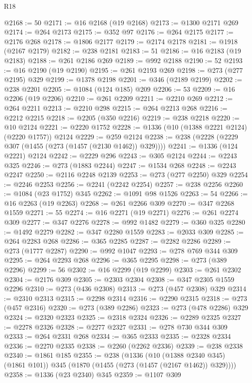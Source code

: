 \begin{lexlean}{R18}
\begin{coremodule}
{{{{{{{{{{{{{{{{{{{{{{{{{{{{{{{{{{{{{{{{{{{{{{{{{{{{{{{{{{{{{{{{{{{{{{{{{{{{{{{{{{{{{{{{{{{{{{{{{{{{{{{{{{{{{{{{{{{{{{{{{{{{{{{{{{{{{{{{{{{{{{{@2168 := 50
@2171 := @16 @2168 (@19 @2168)
@2173 := @1300 @2171 @269
@2174 := @264 @2173
@2175 := @352 @97
@2176 := @264 @2175
@2177 := @2176 @268
@2178 := @1806 @2177
@2179 := @2174 @2178
@2181 := @1918 (@2167 @2179)
@2182 := @238 @2181
@2183 := 51
@2186 := @16 @2183 (@19 @2183)
@2188 := @261 @2186 @269
@2189 := @992 @2188
@2190 := 52
@2193 := @16 @2190 (@19 @2190)
@2195 := @261 @2193 @269
@2198 := @273 (@277 @2195) @329
@2199 := @1378 @2198
@2201 := @346 (@2189 @2199)
@2202 := @238 @2201
@2205 := @1084 (@124 @185) @209
@2206 := 53
@2209 := @16 @2206 (@19 @2206)
@2210 := @261 @2209
@2211 := @2210 @269
@2212 := @264 @2211
@2213 := @2210 @298
@2215 := @264 @2213 @268
@2216 := @2212 @2215
@2218 := @2205 (@350 @2216)
@2219 := @238 @2218
@2220 := @10 @2124
@2221 := @2220 @1752
@2228 := @1336 (@10 (@1388 @2221 @2124) (@2220 @1757)) @2124
@2229 := @259 @2124
@2238 := @238 (@2228 (@2229 @307 (@1455 (@273 (@1457 (@2130 @1462)) @329))))
@2241 := @1336 (@124 @2221) @2124
@2242 := @2229 @296
@2243 := @305 @2124
@2244 := @2243 @325
@2246 := @273 (@1883 @2244)
@2247 := @1534 @268
@2248 := @2243 @2247
@2250 := @2116 @2248 @2139
@2253 := @273 (@277 @2250) @329
@2254 := @2246 @2253
@2256 := @2241 (@2242 @2254)
@2257 := @238 @2256
@2260 := @1084 (@23 @1752) @345
@2262 := @1091 @98 @1526
@2263 := 54
@2266 := @16 @2263 (@19 @2263)
@2268 := @261 @2266 @309
@2270 := @347 @2268 @1559
@2271 := 55
@2274 := @16 @2271 (@19 @2271)
@2276 := @261 @2274 @309
@2277 := @347 @2276
@2278 := @992 @1482
@2279 := @360 @325
@2280 := @1492 @2279
@2282 := @347 @2280 @1559
@2283 := @2033 @309
@2285 := @264 @2283 @268
@2286 := @365 @2285
@2287 := @2282 @2286
@2289 := @273 (@1777 @2287)
@2290 := @992 @1047
@2293 := @278 @769 @344 @309
@2295 := @264 @2293 @268
@2296 := @365 @2295
@2298 := @273 (@389 @2296)
@2299 := 56
@2302 := @16 @2299 (@19 @2299)
@2303 := @261 @2302
@2304 := @2176 @309
@2305 := @2303 @2304
@2308 := @347 @2305 @1559 @2296
@2310 := @273 (@436 @2308)
@2313 := @273 (@457 @2308) @329
@2314 := @2310 @2313
@2315 := @2298 @2314
@2316 := @2290 @2315
@2318 := @273 (@457 @2316)
@2320 := @273 (@389 @2286)
@2323 := @273 (@478 @2286) @329
@2324 := @2320 @2323
@2325 := @2318 @2324
@2326 := @2289 @2325
@2327 := @2278 @2326
@2328 := @2277 @2327
@2331 := @278 @730 @344 @309
@2333 := @264 @2331 @268
@2334 := @365 @2333
@2335 := @2328 @2334
@2336 := @2270 @2335
@2338 := @2260 (@2262 @2336)
@2339 := @238 @2338
@2340 := @1861 @185
@2355 := @238
    (@1336
      (@10 (@1388 @2340 @345) (@1861 @101))
      @345
      (@1870 (@1455 (@273 (@1457 (@2167 @1462)) @329))))
@2358 := @1336 (@23 @2340) @345
@2359 := @1107 @309
}}}}}}}}}}}}}}}}}}}}}}}}}}}}}}}}}}}}}}}}}}}}}}}}}}}}}}}}}}}}}}}}}}}}}}}}}}}}}}}}}}}}}}}}}}}}}}}}}}}}}}}}}}}}}}}}}}}}}}}}}}}}}}}}}}}}}}}}}}}}}}}
\end{coremodule}
\end{lexlean}
